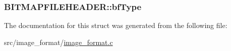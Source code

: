 \hypertarget{structBITMAPFILEHEADER_a37ad25a2c6577794f1e5376b45d5a7de}{
\subsubsection[{bf\+Type}]{ B\+I\+T\+M\+A\+P\+F\+I\+L\+E\+H\+E\+A\+D\+E\+R\+::bf\+Type}}\label{structBITMAPFILEHEADER_a37ad25a2c6577794f1e5376b45d5a7de}


The documentation for this struct was generated from the following file\+:\begin{DoxyCompactItemize}
\item 
src/image\+\_\+format/\hyperlink{image__format_8c}{image\+\_\+format.\+c}\end{DoxyCompactItemize}
